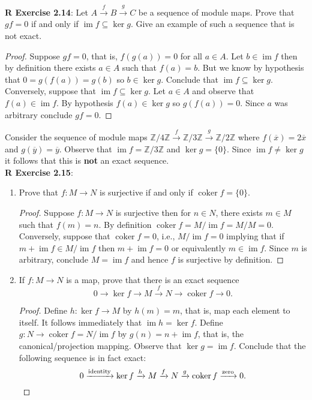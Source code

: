 \documentclass[8pt]{amsart}
\theoremstyle{plain}%
\theoremstyle{definition}
\theoremstyle{remark}
\numberwithin{equation}{section}
\newcommand{\Z}{\mathbb{Z}}
\newcommand{\im}{\operatorname{im}}
\newcommand{\coker}{\operatorname{coker}}
\begin{document}
\textbf{R Exercise 2.14}: Let $A \xrightarrow f B \xrightarrow g C$ be a sequence of module maps. Prove that $gf = 0$ if and only if $\im f \subseteq \ker g$.  Give an example of such a sequence that is not exact.
	\begin{proof}
		Suppose $gf = 0$, that is, $f(g(a)) = 0$ for all $a \in A$. Let $b \in \im f$ then by definition there exists $a \in A$ such that $f(a) = b$. But we know by hypothesis that $0 = g(f(a)) = g(b)$ so $b \in \ker g$. Conclude that $\im f \subseteq \ker g$. Conversely, suppose that $\im f \subseteq \ker g$. Let $a \in A$ and observe that $f(a) \in \im f$. By hypothesis $f(a) \in \ker g$ so $g(f(a)) = 0$. Since $a$ was arbitrary conclude $gf = 0$.
	\end{proof}
	Consider the sequence of module maps $\Z/4\Z \xrightarrow f \Z/3\Z \xrightarrow g \Z/2\Z$ where $f(\overline x) = 2 \overline x$ and $g(\overline y) = \overline y$. Observe that $\im f = \Z/3\Z$  and $\ker g = \{0\}$. Since $\im f \neq \ker g$ it follows that this is \textbf{not} an exact sequence.\\


\textbf{R Exercise 2.15}:
	\begin{enumerate}
		\item Prove that $f : M \to N$ is surjective if and only if $\coker f = \{0\}$.
			\begin{proof}
				Suppose $f : M \to N$ is surjective then for $n \in N$, there exists $m \in M$ such that $f(m) = n$. By definition $\coker f = M/\im f = M/M = 0$. Conversely, suppose that $\coker f = 0$, i.e., $M/\im f = 0$ implying that if $m + \im f \in M/\im f$ then $m + \im f = 0$ or equivalently $m \in \im f$. Since $m$ is arbitrary, conclude $M = \im f$ and hence $f$ is surjective by definition.
			\end{proof}
		\item If $f : M \to N$ is a map, prove that there is an exact sequence $$ 0 \rightarrow \ker f \rightarrow M \xrightarrow f N \rightarrow \coker f \rightarrow 0.$$
			\begin{proof}
				Define $h : \ker f \to M$ by $h(m) = m$, that is, map each element to itself. It follows immediately that $\im h = \ker f$. Define $g : N \to \coker f = N/\im f$ by $g(n) = n + \im f$, that is, the canonical/projection mapping. Observe that $\ker g = \im f$. Conclude that the following sequence is in fact exact: $$0 \xrightarrow{\text{identity}} \ker f \xrightarrow h M \xrightarrow f N \xrightarrow g \coker f \xrightarrow{\text{zero}} 0. \qedhere$$
			\end{proof}
	\end{enumerate}
\end{document}
